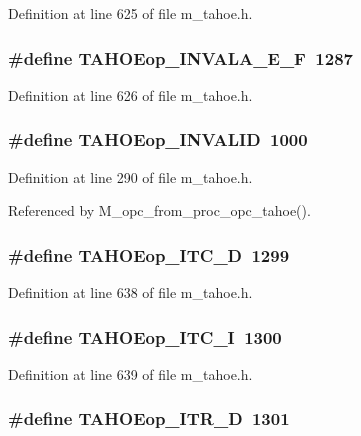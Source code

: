 Definition at line 625 of file m\_\-tahoe.h.
\subsubsection{\setlength{\rightskip}{0pt plus 5cm}\#define TAHOEop\_\-INVALA\_\-E\_\-F~1287}\label{m__tahoe_8h_ec8176166b3230641350280283b09a6d}




Definition at line 626 of file m\_\-tahoe.h.
\subsubsection{\setlength{\rightskip}{0pt plus 5cm}\#define TAHOEop\_\-INVALID~1000}\label{m__tahoe_8h_371a42321937ce04bcd43c63c4077f67}




Definition at line 290 of file m\_\-tahoe.h.

Referenced by M\_\-opc\_\-from\_\-proc\_\-opc\_\-tahoe().
\subsubsection{\setlength{\rightskip}{0pt plus 5cm}\#define TAHOEop\_\-ITC\_\-D~1299}\label{m__tahoe_8h_fbe5025cd12078c14260dd132e000902}




Definition at line 638 of file m\_\-tahoe.h.
\subsubsection{\setlength{\rightskip}{0pt plus 5cm}\#define TAHOEop\_\-ITC\_\-I~1300}\label{m__tahoe_8h_6b2232d1ab6583bd3917dc17ffe6f64c}




Definition at line 639 of file m\_\-tahoe.h.
\subsubsection{\setlength{\rightskip}{0pt plus 5cm}\#define TAHOEop\_\-ITR\_\-D~1301}\label{m__tahoe_8h_a49cf22a15d15040ad8ace235c42a607}




